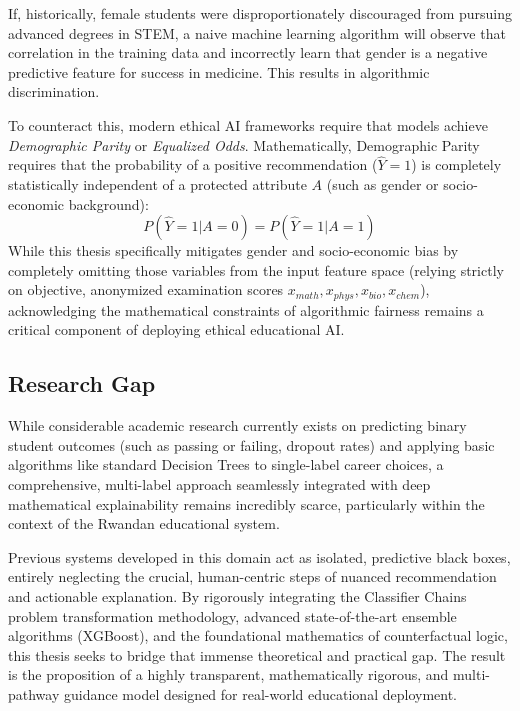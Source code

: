 If, historically, female students were disproportionately discouraged from pursuing advanced degrees in STEM, a naive machine learning algorithm will observe that correlation in the training data and incorrectly learn that gender is a negative predictive feature for success in medicine. This results in algorithmic discrimination. 

To counteract this, modern ethical AI frameworks require that models achieve \textit{Demographic Parity} or \textit{Equalized Odds}. Mathematically, Demographic Parity requires that the probability of a positive recommendation ($\hat{Y}=1$) is completely statistically independent of a protected attribute $A$ (such as gender or socio-economic background):
\[
P(\hat{Y}=1 | A=0) = P(\hat{Y}=1 | A=1)
\]
While this thesis specifically mitigates gender and socio-economic bias by completely omitting those variables from the input feature space (relying strictly on objective, anonymized examination scores $x_{math}, x_{phys}, x_{bio}, x_{chem}$), acknowledging the mathematical constraints of algorithmic fairness remains a critical component of deploying ethical educational AI.

\subsection{Research Gap}

While considerable academic research currently exists on predicting binary student outcomes (such as passing or failing, dropout rates) and applying basic algorithms like standard Decision Trees to single-label career choices, a comprehensive, multi-label \parencite{tsoumakas2007multi} approach seamlessly integrated with deep mathematical explainability remains incredibly scarce, particularly within the context of the Rwandan educational system. 

Previous systems developed in this domain act as isolated, predictive black boxes, entirely neglecting the crucial, human-centric steps of nuanced recommendation and actionable explanation. By rigorously integrating the Classifier Chains \parencite{read2011classifier} problem transformation methodology, advanced state-of-the-art ensemble algorithms (XGBoost), and the foundational mathematics of counterfactual \parencite{wachter2017counterfactual} logic, this thesis seeks to bridge that immense theoretical and practical gap. The result is the proposition of a highly transparent, mathematically rigorous, and multi-pathway guidance model designed for real-world educational deployment.


